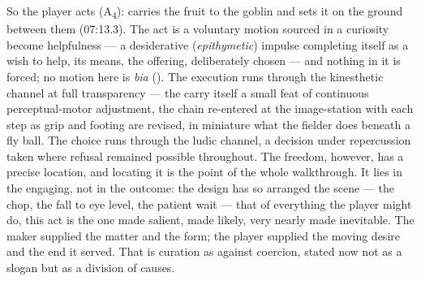 So the player acts (A\textsubscript{4}): carries the fruit to the goblin and sets it on the ground between them (07:13.3). The act is a voluntary motion sourced in a curiosity become helpfulness — a desiderative (\textit{epithymetic}) impulse completing itself as a wish to help, its means, the offering, deliberately chosen — and nothing in it is forced; no motion here is \textit{bia} (). The execution runs through the kinesthetic channel at full transparency — the carry itself a small feat of continuous perceptual-motor adjustment, the chain re-entered at the image-station with each step as grip and footing are revised, in miniature what the fielder does beneath a fly ball. The choice runs through the ludic channel, a decision under repercussion taken where refusal remained possible throughout. The freedom, however, has a precise location, and locating it is the point of the whole walkthrough. It lies in the engaging, not in the outcome: the design has so arranged the scene — the chop, the fall to eye level, the patient wait — that of everything the player might do, this act is the one made salient, made likely, very nearly made inevitable. The maker supplied the matter and the form; the player supplied the moving desire and the end it served. That is curation as against coercion, stated now not as a slogan but as a division of causes.

